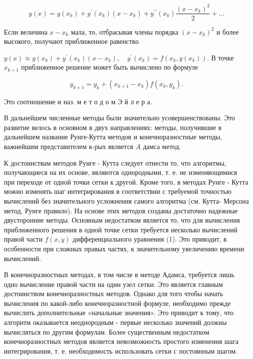 \documentclass[10pt]{article}
\begin{document}
\[

y(\dot{x})=y\left(x_{k}\right)+y^{\prime}\left(x_{k}\right)\left(x-x_{k}\right)+y^{\prime \prime}\left(x_{k}\right) \frac{\left(x-x_{k}\right)^{2}}{2}+\ldots

\]



Если величина $x-x_{k}$ мала, то, отбрасывая члены порядка $\left(x-x_{k}\right)^{2}$ и более высокого, получают приближенное равенство



$y(x) \approx y\left(x_{k}\right)+y^{\prime}\left(x_{k}\right)\left(x-x_{k}\right), \quad y^{\prime}\left(x_{k}\right)=f\left(x_{k}, y\left(x_{k}\right)\right)$. В точке $x_{k+1}$ приближенное решение может быть вычислено по формуле



\[

y_{k+1}=y_{k}+\left(x_{k+1}-x_{k}\right) f\left(x_{k}, y_{k}\right) .

\]



Это соотношение и наз. м е т о д о м Э й л е р а.



В дальнейшем численные методы были значительно усовершенствованы. Это развитие велось в основном в двух направлениях: методы, получившие в дальнейшем название Рунге-Кутта методов и конечноразностные методы, важнейшим представителем к-рых является $A$ дамса метод.



К достоинствам методов Рунге - Кутта следует отнести то, что алгоритмы, получающиеся на их основе, являются однородными, т. е. не изменяющимися при переходе от одной точки сетки к другой. Кроме того, в методах Рунге - Кутта можно изменять шаг интегрирования в соответствии с требуемой точностью вычислений без значительного усложнения самого алгоритма (см. Кутта- Мерсона метод, Рунге правило). На основе этих методов созданы достаточно надежные двусторонние методы. Основным недостатком является то, что для вычисления приближенного решения в одной точке сетки требуется несколько вычислений правой части $f(x, y)$ дифференциального уравнения (1). Это приводит, в особенности при сложных правых частях, к зиачительному увеличению времени вычислений.



В конечноразностных методах, в том числе в методе Адамса, требуется лишь одно вычисление правой части на один узел сетки. Это является главным достоинством конечноразностных методов. Однако для того чтобы начать вычисления по какой-либо конечноразностной формуле, необходимо прежде вычислить дополнительные «начальные значения». Это приводит к тому, что алгоритм оказывается неоднородным - первые несколько значений должны вычисляться по другим формулам. Более существенным недостатком конечноразностных методов является невозможность простого изменения шага интегрирования, т. е. необходимость использовать сетки с постоянным шагом.
\end{document}
